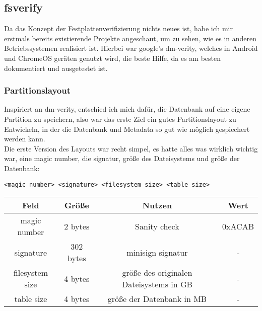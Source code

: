 \subsection{fsverify}
Da das Konzept der Festplattenverifizierung nichts neues ist, habe ich mir erstmals bereits existierende Projekte angeschaut, um zu sehen, wie es in anderen Betriebssystemen realisiert ist.
Hierbei war google's dm-verity, welches in Android und ChromeOS geräten genutzt wird, die beste Hilfe, da es am besten dokumentiert und ausgetestet ist.

\subsubsection{Partitionslayout}
Inspiriert an dm-verity, entschied ich mich dafür, die Datenbank auf eine eigene Partition zu speichern, also war das erste Ziel ein gutes Partitionslayout zu Entwickeln, in der die Datenbank und Metadata so gut wie möglich gespiechert werden kann.
\\
Die erste Version des Layouts war recht simpel, es hatte alles was wirklich wichtig war, eine magic number, die signatur, größe des Dateisystems und größe der Datenbank:
\begin{verbatim}
<magic number> <signature> <filesystem size> <table size>
\end{verbatim}

\begin{center}
  \begin{tabular}{|c | c | c | c|}
    \hline
    Feld & Größe & Nutzen & Wert \\ [0.5ex]
    \hline
    magic number & 2 bytes & Sanity check & 0xACAB \\
    \hline
    signature & 302 bytes & minisign signatur & - \\
    \hline
    filesystem size & 4 bytes & größe des originalen Dateisystems in GB & - \\
    \hline
    table size & 4 bytes & größe der Datenbank in MB & - \\
    \hline
  \end{tabular}
\end{center}

